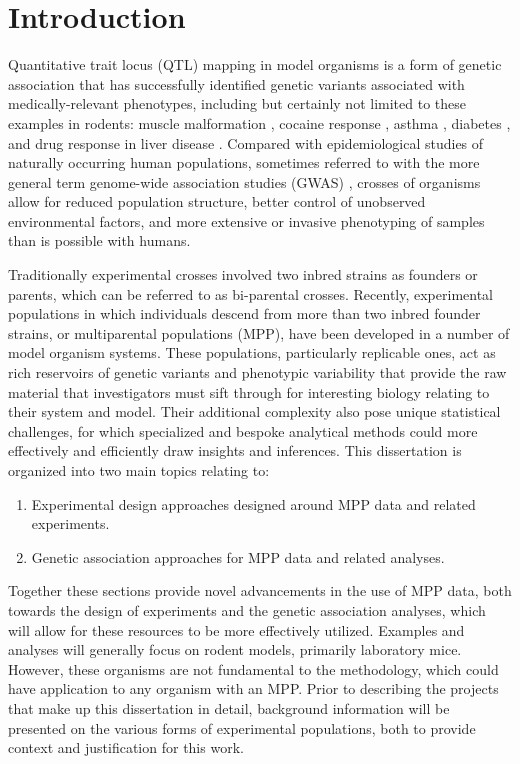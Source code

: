 \chapter{Introduction}\label{chap:intro}

Quantitative trait locus (QTL) mapping in model organisms is a form of genetic association that has successfully identified genetic variants associated with medically-relevant phenotypes, including but certainly not limited to these examples in rodents: muscle malformation \citep{Hartmann2008, Kelly2013}, cocaine response \citep{Kumar2013}, asthma \citep{Kelada2016,Donoghue2017}, diabetes \citep{SolbergWoods2010,SolbergWoods2012,Keele2017}, and drug response in liver disease \citep{Mosedale2017}. Compared with epidemiological studies of naturally occurring human populations, sometimes referred to with the more general term genome-wide association studies (GWAS) \citep{Mccarthy2008,Teslovich2010,Ripke2014}, crosses of organisms allow for reduced population structure, better control of unobserved environmental factors, and more extensive or invasive phenotyping of samples than is possible with humans. 

Traditionally experimental crosses involved two inbred strains as founders or parents, which can be referred to as bi-parental crosses. Recently, experimental populations in which individuals descend from more than two inbred founder strains, or multiparental populations (MPP), have been developed in a number of model organism systems. These populations, particularly replicable ones, act as rich reservoirs of genetic variants and phenotypic variability that provide the raw material that investigators must sift through for interesting biology relating to their system and model. Their additional complexity also pose unique statistical challenges, for which specialized and bespoke analytical methods could more effectively and efficiently draw insights and inferences. This dissertation is organized into two main topics relating to:
\begin{enumerate} 
	\item Experimental design approaches designed around MPP data and related experiments.
	\item Genetic association approaches for MPP data and related analyses.
\end{enumerate}
Together these sections provide novel advancements in the use of MPP data, both towards the design of experiments and the genetic association analyses, which will allow for these resources to be more effectively utilized. Examples and analyses will generally focus on rodent models, primarily laboratory mice. However, these organisms are not fundamental to the methodology, which could have application to any organism with an MPP. Prior to describing the projects that make up this dissertation in detail, background information will be presented on the various forms of experimental populations, both to provide context and justification for this work.

